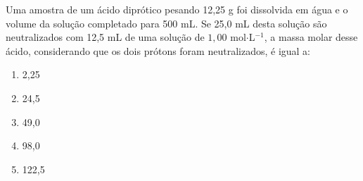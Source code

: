 Uma amostra de um ácido diprótico pesando 12,25 g foi dissolvida em água e o volume da solução completado para 500 mL.
Se 25,0 mL desta solução são neutralizados com 12,5 mL de uma solução de  $1,00$ mol$\cdot$L$^{-1}$, a massa molar desse ácido, considerando que os dois prótons foram neutralizados, é igual a:

\begin{enumerate}[label = (\alph*)]
	\item 2,25
	\item 24,5
	\item 49,0
	\item 98,0
	\item 122,5
\end{enumerate}

